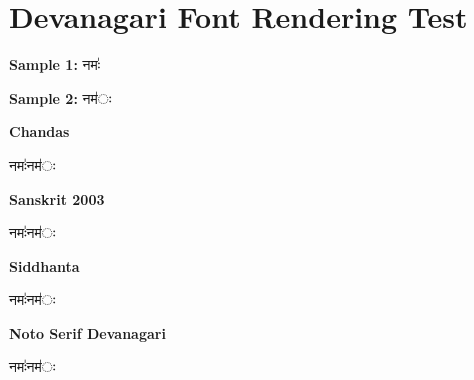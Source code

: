 \documentclass[12pt]{article}
\newcommand{\samplevisargafirst}{नमः॑}
\newcommand{\sampleaccentfirst}{नम॑ः}
\begin{document}
\section*{Devanagari Font Rendering Test}

\textbf{Sample 1:} \samplevisargafirst

\textbf{Sample 2:} \sampleaccentfirst

\bigskip

\textbf{Chandas}

{\chandasfont\fontsize{34}{42}\selectfont \samplevisargafirst\quad \sampleaccentfirst}

\bigskip

\textbf{Sanskrit 2003}

{\sanskrittwokfont\fontsize{34}{42}\selectfont \samplevisargafirst\quad \sampleaccentfirst}

\bigskip

\textbf{Siddhanta}

{\siddhantafont\fontsize{34}{42}\selectfont \samplevisargafirst\quad \sampleaccentfirst}

\bigskip

\textbf{Noto Serif Devanagari}

{\notoserifdevanagarifont\fontsize{34}{42}\selectfont \samplevisargafirst\quad \sampleaccentfirst}
\end{document}
